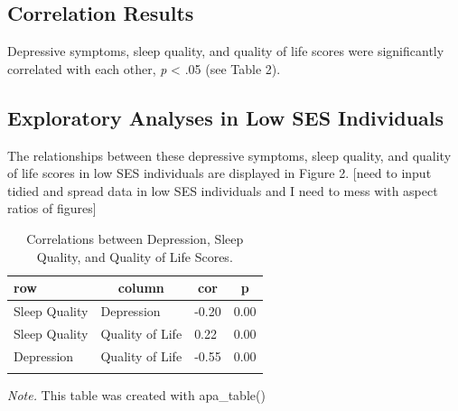 \documentclass[man, noextraspace]{apa6}
\theoremstyle{definition}
\theoremstyle{definition}
\theoremstyle{definition}
\theoremstyle{remark}
\begin{document}
\subsection{Correlation Results}\label{correlation-results}

Depressive symptoms, sleep quality, and quality of life scores were
significantly correlated with each other, \emph{p} \textless{} .05 (see
Table 2).

\subsection{Exploratory Analyses in Low SES
Individuals}\label{exploratory-analyses-in-low-ses-individuals}

The relationships between these depressive symptoms, sleep quality, and
quality of life scores in low SES individuals are displayed in Figure 2.
{[}need to input tidied and spread data in low SES individuals and I
need to mess with aspect ratios of figures{]}

\begin{table}[tbp]
\begin{center}
\begin{threeparttable}
\caption{\label{tab:table2}Correlations between Depression, Sleep Quality, and Quality of Life Scores.}
\begin{tabular}{llll}
\toprule
row & \multicolumn{1}{c}{column} & \multicolumn{1}{c}{cor} & \multicolumn{1}{c}{p}\\
\midrule
Sleep Quality & Depression & -0.20 & 0.00\\
Sleep Quality & Quality of Life & 0.22 & 0.00\\
Depression & Quality of Life & -0.55 & 0.00\\
\bottomrule
\addlinespace
\end{tabular}
\begin{tablenotes}[para]
\normalsize{\textit{Note.} This table was created with apa\_table()}
\end{tablenotes}
\end{threeparttable}
\end{center}
\end{table}
\end{document}
